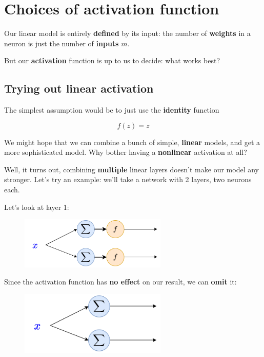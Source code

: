 \section*{Choices of activation function}

    Our linear model is entirely \textbf{defined} by its input: the number of \textbf{weights} in a neuron is just the number of \textbf{inputs} $m$.
    
    But our \textbf{activation} function is up to us to decide: what works best?
    
    \subsection*{Trying out linear activation}
        
        The simplest assumption would be to just use the \textbf{identity} function 
        
        \begin{equation}
            f(z) = z
        \end{equation}
        
        We might hope that we can combine a bunch of simple, \textbf{linear} models, and get a more sophisticated model. Why bother having a \textbf{nonlinear} activation at all?
        
        Well, it turns out, combining \textbf{multiple} linear layers doesn't make our model any stronger. Let's try an example: we'll take a network with 2 layers, two neurons each.
        
        Let's look at layer 1: 
        
        \begin{figure}[H]
            \centering
            \includegraphics[width=70mm,scale=0.4]{images/nn_images/layer_one_linear.png}
        \end{figure}
        
        Since the activation function has \textbf{no effect} on our result, we can \textbf{omit} it:
        
        \begin{figure}[H]
            \centering
            \includegraphics[width=70mm,scale=0.4]{images/nn_images/linear_layer_omitted.png}
        \end{figure}
        
